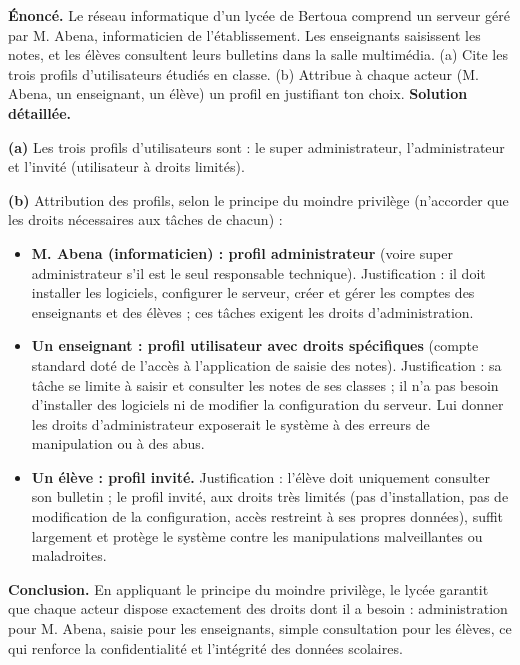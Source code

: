 \documentclass[11pt]{article}
\newcommand{\cle}[1]{{\popxbold\color{popdark}#1}}
\begin{document}
\begin{exoresolu}
\textbf{Énoncé.} Le réseau informatique d'un lycée de Bertoua comprend un serveur géré par M. Abena, informaticien de l'établissement. Les enseignants saisissent les notes, et les élèves consultent leurs bulletins dans la salle multimédia. (a) Cite les trois profils d'utilisateurs étudiés en classe. (b) Attribue à chaque acteur (M. Abena, un enseignant, un élève) un profil en justifiant ton choix.
\tcblower
\textbf{Solution détaillée.}

\textbf{(a)} Les trois profils d'utilisateurs sont : le \cle{super administrateur}, l'\cle{administrateur} et l'\cle{invité} (utilisateur à droits limités).

\textbf{(b)} Attribution des profils, selon le principe du moindre privilège (n'accorder que les droits nécessaires aux tâches de chacun) :

\begin{itemize}
  \item \textbf{M. Abena (informaticien) : profil administrateur} (voire super administrateur s'il est le seul responsable technique). Justification : il doit installer les logiciels, configurer le serveur, créer et gérer les comptes des enseignants et des élèves ; ces tâches exigent les droits d'administration.
  \item \textbf{Un enseignant : profil utilisateur avec droits spécifiques} (compte standard doté de l'accès à l'application de saisie des notes). Justification : sa tâche se limite à saisir et consulter les notes de ses classes ; il n'a pas besoin d'installer des logiciels ni de modifier la configuration du serveur. Lui donner les droits d'administrateur exposerait le système à des erreurs de manipulation ou à des abus.
  \item \textbf{Un élève : profil invité.} Justification : l'élève doit uniquement consulter son bulletin ; le profil invité, aux droits très limités (pas d'installation, pas de modification de la configuration, accès restreint à ses propres données), suffit largement et protège le système contre les manipulations malveillantes ou maladroites.
\end{itemize}

\textbf{Conclusion.} En appliquant le principe du moindre privilège, le lycée garantit que chaque acteur dispose exactement des droits dont il a besoin : administration pour M. Abena, saisie pour les enseignants, simple consultation pour les élèves, ce qui renforce la confidentialité et l'intégrité des données scolaires.
\end{exoresolu}
\end{document}

